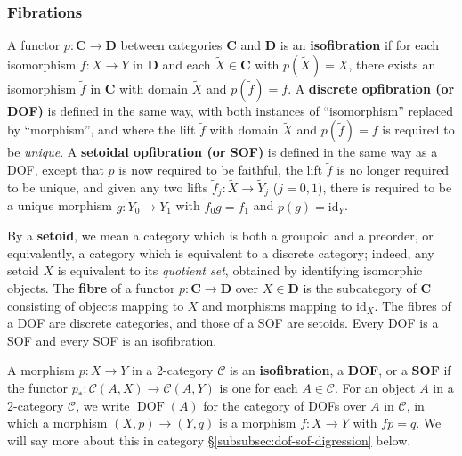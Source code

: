 \documentclass{amsart}
\newcommand\bC{\mathbf{C}}
\newcommand\bD{\mathbf{D}}
\newcommand\cC{\mathcal{C}}
\newcommand\defword[1]{{\boldmath \textbf{#1}}}
\newcommand\DOF{\operatorname{DOF}}
\newcommand\id{\mathrm{id}}
\newcommand\wt[1]{\widetilde{#1}}
\newcommand\prerefpost[3]{%
  \texorpdfstring%
    {\hyperref[#2]{#1\ref*{#2}#3}}%
    {#1\ref*{#2}#3}%
}
\newcommand\sref[1]{\prerefpost{\S}{#1}{}}
\theoremstyle{definition}
\theoremstyle{remark}
\theoremstyle{plainwithref}
\begin{document}
\subsubsection{Fibrations}
A functor \( p \colon \bC \to \bD \) between categories \( \bC \) and \( \bD \) is an \defword{isofibration} if for each isomorphism \( f \colon X \to Y \) in \( \bD \) and each \( \wt X \in \bC \) with \( p(\wt X) = X \), there exists an isomorphism \( \tilde f \) in \( \bC \) with domain \( \wt X \) and \( p(\tilde f) = f \).
A \defword{discrete opfibration (or DOF)} is defined in the same way, with both instances of ``isomorphism'' replaced by ``morphism'', and where the lift \( \tilde f \) with domain \( \wt X \) and \( p(\tilde f) = f \) is required to be \emph{unique}.
A \defword{setoidal opfibration (or SOF)} is defined in the same way as a DOF, except that \( p \) is now required to be faithful, the lift \( \tilde f \) is no longer required to be unique, and given any two lifts \( \tilde f_j \colon \wt X \to \wt Y_j \) (\( j = 0,1 \)), there is required to be a unique morphism \( g \colon \wt Y_0 \to \wt Y_1 \) with \( \tilde f_0 g = \tilde f_1 \) and \( p(g) = \id_Y \).

By a \defword{setoid}, we mean a category which is both a groupoid and a preorder, or equivalently, a category which is equivalent to a discrete category; indeed, any setoid \( X \) is equivalent to its \emph{quotient set}, obtained by identifying isomorphic objects.
The \defword{fibre} of a functor \( p \colon \bC \to \bD \) over \( X \in \bD \) is the subcategory of \( \bC \) consisting of objects mapping to \( X \) and morphisms mapping to \( \id_X \).
The fibres of a DOF are discrete categories, and those of a SOF are setoids.
Every DOF is a SOF and every SOF is an isofibration.

A morphism \( p \colon X \to Y \) in a 2-category \( \cC \) is an \defword{isofibration}, a \defword{DOF}, or a \defword{SOF} if the functor \( p_* \colon \cC(A,X) \to \cC(A, Y) \) is one for each \( A \in \cC \).
For an object \( A \) in a 2-category \( \cC \), we write \( \DOF(A) \) for the category of DOFs over \( A \) in \( \cC \), in which a morphism \( (X, p) \to (Y, q) \) is a morphism \( f \colon X \to Y \) with \( f p = q \).
We will say more about this in category \sref{subsubsec:dof-sof-digression} below.
\end{document}
